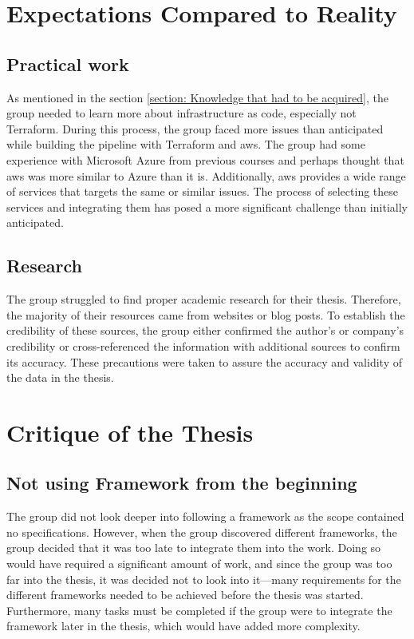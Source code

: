 \section{Expectations Compared to Reality}
\subsection{Practical work}
As mentioned in the section \ref{section: Knowledge that had to be acquired}, the group needed to learn more about  \gls{infrastructure as code}, especially not Terraform. During this process, the group faced more issues than anticipated while building the pipeline with Terraform and \acrshort{aws}. The group had some experience with Microsoft Azure from previous courses and perhaps thought that \acrshort{aws} was more similar to Azure than it is. Additionally, \acrshort{aws} provides a wide range of services that targets the same or similar issues. The process of selecting these services and integrating them has posed a more significant challenge than initially anticipated. 

\subsection{Research}
The group struggled to find proper academic research for their thesis. Therefore, the majority of their resources came from websites or blog posts. To establish the credibility of these sources, the group either confirmed the author's or company's credibility or cross-referenced the information with additional sources to confirm its accuracy. These precautions were taken to assure the accuracy and validity of the data in the thesis.


\section{Critique of the Thesis}

\subsection{Not using Framework from the beginning}
The group did not look deeper into following a framework as the scope contained no specifications. However, when the group discovered different frameworks, the group decided that it was too late to integrate them into the work. Doing so would have required a significant amount of work, and since the group was too far into the thesis, it was decided not to look into it—many requirements for the different frameworks needed to be achieved before the thesis was started. Furthermore, many tasks must be completed if the group were to integrate the framework later in the thesis, which would have added more complexity. 


